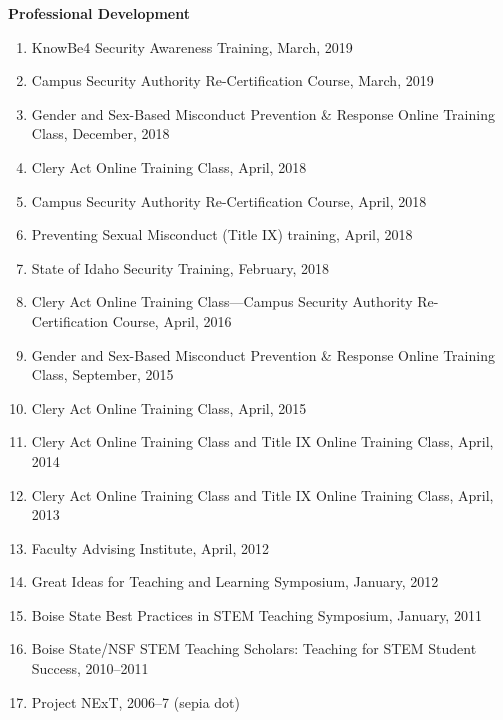 \documentclass[12pt]{article}
\begin{document}
\textbf{Professional Development}
\begin{enumerate}
\item KnowBe4 Security Awareness Training, March, 2019
\item Campus Security Authority Re-Certification Course, March, 2019
\item Gender and Sex-Based Misconduct Prevention \& Response Online Training Class, December, 2018
\item Clery Act Online Training Class, April, 2018
\item Campus Security Authority Re-Certification Course, April, 2018
\item Preventing Sexual Misconduct (Title IX) training, April, 2018
\item State of Idaho Security Training, February, 2018
\item Clery Act Online Training Class---Campus Security Authority Re-Certification Course, April, 2016
\item Gender and Sex-Based Misconduct Prevention \& Response Online Training Class, September, 2015
\item Clery Act Online Training Class, April, 2015
\item Clery Act Online Training Class and Title IX Online Training Class, April, 2014
\item Clery Act Online Training Class and Title IX Online Training Class, April, 2013
\item Faculty Advising Institute, April, 2012
\item Great Ideas for Teaching and Learning Symposium, January, 2012
\item Boise State Best Practices in STEM Teaching Symposium, January, 2011
\item Boise State/NSF STEM Teaching Scholars: Teaching for STEM Student Success, 2010--2011
\item Project NExT, 2006--7 (sepia dot)%
\end{enumerate}
\end{document}

